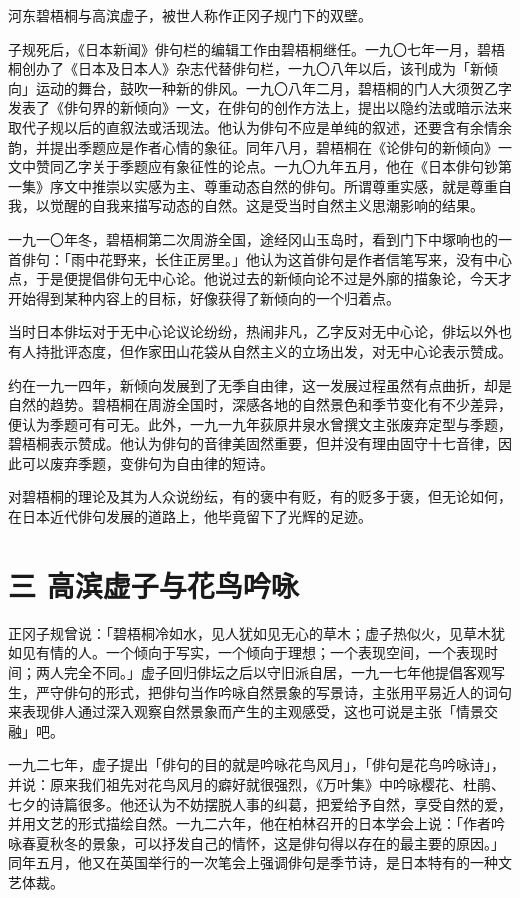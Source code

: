{\FS
    河东碧梧桐与高滨虚子，被世人称作正冈子规门下的双壁。

    子规死后，《日本新闻》俳句栏的编辑工作由碧梧桐继任。一九〇七年一月，碧梧桐创办了《日本及日本人》杂志代替俳句栏，一九〇八年以后，该刊成为「新倾向」运动的舞台，鼓吹一种新的俳风。一九〇八年二月，碧梧桐的门人大须贺乙字发表了《俳句界的新倾向》一文，在俳句的创作方法上，提出以隐约法或暗示法来取代子规以后的直叙法或活现法。他认为俳句不应是单纯的叙述，还要含有余情余韵，并提出季题应是作者心情的象征。同年八月，碧梧桐在《论俳句的新倾向》一文中赞同乙字关于季题应有象征性的论点。一九〇九年五月，他在《日本俳句钞第一集》序文中推崇以实感为主、尊重动态自然的俳句。所谓尊重实感，就是尊重自我，以觉醒的自我来描写动态的自然。这是受当时自然主义思潮影响的结果。

    一九一〇年冬，碧梧桐第二次周游全国，途经冈山玉岛时，看到门下中塚响也的一首俳句：「雨中花野来，长住正房里。」他认为这首俳句是作者信笔写来，没有中心点，于是便提倡俳句无中心论。他说过去的新倾向论不过是外廓的描象论，今天才开始得到某种内容上的目标，好像获得了新倾向的一个归着点。

    当时日本俳坛对于无中心论议论纷纷，热闹非凡，乙字反对无中心论，俳坛以外也有人持批评态度，但作家田山花袋从自然主义的立场出发，对无中心论表示赞成。

    约在一九一四年，新倾向发展到了无季自由律，这一发展过程虽然有点曲折，却是自然的趋势。碧梧桐在周游全国时，深感各地的自然景色和季节变化有不少差异，便认为季题可有可无。此外，一九一九年荻原井泉水曾撰文主张废弃定型与季题，碧梧桐表示赞成。他认为俳句的音律美固然重要，但并没有理由固守十七音律，因此可以废弃季题，变俳句为自由律的短诗。

    对碧梧桐的理论及其为人众说纷纭，有的褒中有贬，有的贬多于褒，但无论如何，在日本近代俳句发展的道路上，他毕竟留下了光辉的足迹。
}

\section*{\FS 三 高滨虚子与花鸟吟咏}

{\FS
    正冈子规曾说：「碧梧桐冷如水，见人犹如见无心的草木；虚子热似火，见草木犹如见有情的人。一个倾向于写实，一个倾向于理想；一个表现空间，一个表现时间；两人完全不同。」虚子回归俳坛之后以守旧派自居，一九一七年他提倡客观写生，严守俳句的形式，把俳句当作吟咏自然景象的写景诗，主张用平易近人的词句来表现俳人通过深入观察自然景象而产生的主观感受，这也可说是主张「情景交融」吧。

    一九二七年，虚子提出「俳句的目的就是吟咏花鸟风月」，「俳句是花鸟吟咏诗」，并说：原来我们祖先对花鸟风月的癖好就很强烈，《万叶集》中吟咏樱花、杜鹃、七夕的诗篇很多。他还认为不妨摆脱人事的纠葛，把爱给予自然，享受自然的爱，并用文艺的形式描绘自然。一九二六年，他在柏林召开的日本学会上说：「作者吟咏春夏秋冬的景象，可以抒发自己的情怀，这是俳句得以存在的最主要的原因。」同年五月，他又在英国举行的一次笔会上强调俳句是季节诗，是日本特有的一种文艺体裁。
}

